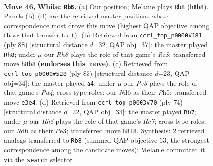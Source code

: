 \documentclass[11pt]{article}
\begin{document}
\clearpage

\begin{figure}[p]\centering
\begin{subfigure}{0.46\textwidth}\centering
\resizebox{\linewidth}{!}{%
\newchessgame
\chessboard[
  setfen={7R/6p1/3Nppk1/7p/1p1P1P1P/1r2P1PK/8/8 w - - 0 46},
  showmover=false,
  pgfstyle=straightmove, color=movearrow, markmove={h8-b8}
]}
\caption{}
\end{subfigure}\hfill
\begin{subfigure}{0.46\textwidth}\centering
\resizebox{\linewidth}{!}{%
\newchessgame
\chessboard[
  setfen={4R3/5r1p/2p3p1/3kp3/3p2PP/3P1P2/2P1K3/8 w - - 11 45},
  showmover=false,
  pgfstyle=straightmove, color=movearrow, markmove={e8-h8}
]}
\caption{}
\end{subfigure}
\\[4pt]
\begin{subfigure}{0.46\textwidth}\centering
\resizebox{\linewidth}{!}{%
\newchessgame
\chessboard[
  setfen={8/4kp2/2r1p1p1/p5Pp/5P1P/R1P3K1/P7/8 b - - 0 42},
  showmover=false,
  pgfstyle=straightmove, color=movearrow, markmove={a5-a4}
]}
\caption{}
\end{subfigure}\hfill
\begin{subfigure}{0.46\textwidth}\centering
\resizebox{\linewidth}{!}{%
\newchessgame
\chessboard[
  setfen={8/2R2pp1/1p2pk2/pP5p/r4P1P/4PKP1/8/8 w - - 0 38},
  showmover=false,
  pgfstyle=straightmove, color=movearrow, markmove={c7-b7}
]}
\caption{}
\end{subfigure}
\caption{\textbf{Move 46, White: \texttt{Rb8}.} (a) Our position; Melanie plays \texttt{Rb8} (\texttt{h8b8}). Panels (b)--(d) are the retrieved master positions whose correspondence most drove this move (highest QAP objective among those that transfer to it). (b) Retrieved from \texttt{ccrl\_top\_p0000\#181} (ply 88) [structural distance $d$=32, QAP obj=37]: the master played \texttt{Rh8}; under $\mu$ our \emph{Rh8} plays the role of that game's \emph{Re8}; transferred move \texttt{h8b8} \textbf{(endorses this move)}. (c) Retrieved from \texttt{ccrl\_top\_p0000\#528} (ply 83) [structural distance $d$=23, QAP obj=34]: the master played \texttt{a4}; under $\mu$ our \emph{Pe3} plays the role of that game's \emph{Pa4}; cross-type roles: our \emph{N}d6 as their \emph{P}h5; transferred move \texttt{e3e4}. (d) Retrieved from \texttt{ccrl\_top\_p0003\#70} (ply 74) [structural distance $d$=22, QAP obj=33]: the master played \texttt{Rb7}; under $\mu$ our \emph{Rh8} plays the role of that game's \emph{Rc7}; cross-type roles: our \emph{N}d6 as their \emph{P}e3; transferred move \texttt{h8f8}. Synthesis: 2 retrieved analogs transferred to \texttt{Rb8} (summed QAP objective 63, the strongest correspondence among the candidate moves); Melanie committed it via the \texttt{search} selector.}
\label{fig:thought-m90}
\end{figure}
\end{document}
